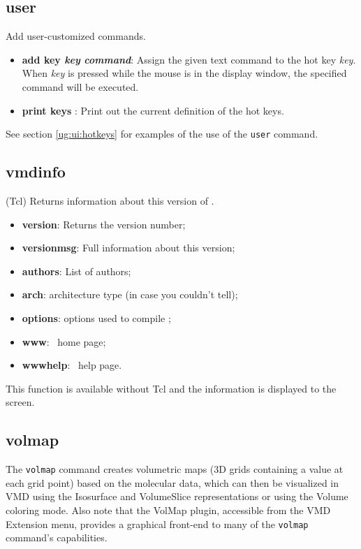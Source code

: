   \subsection{user}
Add user-customized commands.
  \begin{itemize}
    \item {\bf  add key {\it key} {\it command}}: Assign the given
text command to the hot key {\it key}.  When {\it key} is pressed while
the mouse is in the display window, the specified command will be executed.
    \item {\bf  print keys }: Print out the current definition of the hot keys.
  \end{itemize}
See section \ref{ug:ui:hotkeys} for
examples of the use of the {\tt user} command.

  \subsection{vmdinfo}
(Tcl) Returns information about this version of \VMD.
  \begin{itemize}
	\item {\bf version}: Returns the version number;
	\item {\bf versionmsg}: Full information about this version;
	\item {\bf authors}: List of authors;
	\item {\bf arch}: architecture type (in case you couldn't tell);
	\item {\bf options}: options used to compile \VMD;
	\item {\bf www}: \VMD\ home page;
	\item {\bf wwwhelp}: \VMD\ help page.
  \end{itemize}
This function is available without Tcl and the information is 
displayed to the screen.



\subsection{volmap}
\label{ug:ui:text:volmap}

The {\tt volmap} command creates volumetric maps (3D grids containing a value at
each grid point) based on the molecular data, which can then be visualized in
VMD using the Isosurface and VolumeSlice representations or using the Volume
coloring mode. Also note that the VolMap plugin, accessible from the VMD
Extension menu, provides a graphical front-end to many of the {\tt volmap}
command's capabilities.

